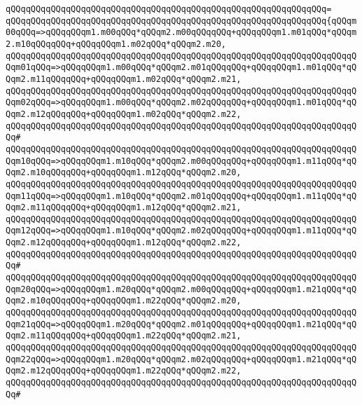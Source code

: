 \verb|qQQqqQQqqQQqqQQqqQQqqQQqqQQqqQQqqQQqqQQqqQQqqQQqqQQqqQQqqQQqqQQq=|\newline
\verb|qQQqqQQqqQQqqQQqqQQqqQQqqQQqqQQqqQQqqQQqqQQqqQQqqQQqqQQqqQQqqQQq{qQQqm00qQQq=>qQQqqQQqm1.m00qQQq*qQQqm2.m00qQQqqQQq+qQQqqQQqm1.m01qQQq*qQQqm2.m10qQQqqQQq+qQQqqQQqm1.m02qQQq*qQQqm2.m20,|\newline
\verb|qQQqqQQqqQQqqQQqqQQqqQQqqQQqqQQqqQQqqQQqqQQqqQQqqQQqqQQqqQQqqQQqqQQqqQQqm01qQQq=>qQQqqQQqm1.m00qQQq*qQQqm2.m01qQQqqQQq+qQQqqQQqm1.m01qQQq*qQQqm2.m11qQQqqQQq+qQQqqQQqm1.m02qQQq*qQQqm2.m21,|\newline
\verb|qQQqqQQqqQQqqQQqqQQqqQQqqQQqqQQqqQQqqQQqqQQqqQQqqQQqqQQqqQQqqQQqqQQqqQQqm02qQQq=>qQQqqQQqm1.m00qQQq*qQQqm2.m02qQQqqQQq+qQQqqQQqm1.m01qQQq*qQQqm2.m12qQQqqQQq+qQQqqQQqm1.m02qQQq*qQQqm2.m22,|\newline
\verb|qQQqqQQqqQQqqQQqqQQqqQQqqQQqqQQqqQQqqQQqqQQqqQQqqQQqqQQqqQQqqQQqqQQqqQQq#|\newline
\verb|qQQqqQQqqQQqqQQqqQQqqQQqqQQqqQQqqQQqqQQqqQQqqQQqqQQqqQQqqQQqqQQqqQQqqQQqm10qQQq=>qQQqqQQqm1.m10qQQq*qQQqm2.m00qQQqqQQq+qQQqqQQqm1.m11qQQq*qQQqm2.m10qQQqqQQq+qQQqqQQqm1.m12qQQq*qQQqm2.m20,|\newline
\verb|qQQqqQQqqQQqqQQqqQQqqQQqqQQqqQQqqQQqqQQqqQQqqQQqqQQqqQQqqQQqqQQqqQQqqQQqm11qQQq=>qQQqqQQqm1.m10qQQq*qQQqm2.m01qQQqqQQq+qQQqqQQqm1.m11qQQq*qQQqm2.m11qQQqqQQq+qQQqqQQqm1.m12qQQq*qQQqm2.m21,|\newline
\verb|qQQqqQQqqQQqqQQqqQQqqQQqqQQqqQQqqQQqqQQqqQQqqQQqqQQqqQQqqQQqqQQqqQQqqQQqm12qQQq=>qQQqqQQqm1.m10qQQq*qQQqm2.m02qQQqqQQq+qQQqqQQqm1.m11qQQq*qQQqm2.m12qQQqqQQq+qQQqqQQqm1.m12qQQq*qQQqm2.m22,|\newline
\verb|qQQqqQQqqQQqqQQqqQQqqQQqqQQqqQQqqQQqqQQqqQQqqQQqqQQqqQQqqQQqqQQqqQQqqQQq#|\newline
\verb|qQQqqQQqqQQqqQQqqQQqqQQqqQQqqQQqqQQqqQQqqQQqqQQqqQQqqQQqqQQqqQQqqQQqqQQqm20qQQq=>qQQqqQQqm1.m20qQQq*qQQqm2.m00qQQqqQQq+qQQqqQQqm1.m21qQQq*qQQqm2.m10qQQqqQQq+qQQqqQQqm1.m22qQQq*qQQqm2.m20,|\newline
\verb|qQQqqQQqqQQqqQQqqQQqqQQqqQQqqQQqqQQqqQQqqQQqqQQqqQQqqQQqqQQqqQQqqQQqqQQqm21qQQq=>qQQqqQQqm1.m20qQQq*qQQqm2.m01qQQqqQQq+qQQqqQQqm1.m21qQQq*qQQqm2.m11qQQqqQQq+qQQqqQQqm1.m22qQQq*qQQqm2.m21,|\newline
\verb|qQQqqQQqqQQqqQQqqQQqqQQqqQQqqQQqqQQqqQQqqQQqqQQqqQQqqQQqqQQqqQQqqQQqqQQqm22qQQq=>qQQqqQQqm1.m20qQQq*qQQqm2.m02qQQqqQQq+qQQqqQQqm1.m21qQQq*qQQqm2.m12qQQqqQQq+qQQqqQQqm1.m22qQQq*qQQqm2.m22,|\newline
\verb|qQQqqQQqqQQqqQQqqQQqqQQqqQQqqQQqqQQqqQQqqQQqqQQqqQQqqQQqqQQqqQQqqQQqqQQq#|\newline
